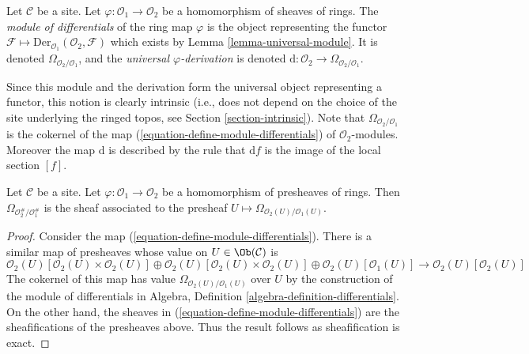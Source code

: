 \begin{definition}
\label{definition-module-differentials}
Let $\mathcal{C}$ be a site. Let $\varphi : \mathcal{O}_1 \to \mathcal{O}_2$
be a homomorphism of sheaves of rings. The {\it module of differentials}
of the ring map $\varphi$ is the object representing the functor
$\mathcal{F} \mapsto \text{Der}_{\mathcal{O}_1}(\mathcal{O}_2, \mathcal{F})$
which exists by Lemma \ref{lemma-universal-module}.
It is denoted $\Omega_{\mathcal{O}_2/\mathcal{O}_1}$, and the {\it universal
$\varphi$-derivation} is denoted
$\text{d} : \mathcal{O}_2 \to \Omega_{\mathcal{O}_2/\mathcal{O}_1}$.
\end{definition}

\noindent
Since this module and the derivation form the universal object representing
a functor, this notion is clearly intrinsic (i.e., does not depend
on the choice of the site underlying the ringed topos, see
Section \ref{section-intrinsic}).
Note that $\Omega_{\mathcal{O}_2/\mathcal{O}_1}$ is the cokernel of
the map (\ref{equation-define-module-differentials}) of
$\mathcal{O}_2$-modules. Moreover the map $\text{d}$ is described
by the rule that $\text{d}f$ is the image of the local section $[f]$.

\begin{lemma}
\label{lemma-differentials-sheafify}
Let $\mathcal{C}$ be a site. Let $\varphi : \mathcal{O}_1 \to \mathcal{O}_2$
be a homomorphism of presheaves of rings. Then
$\Omega_{\mathcal{O}_2^\#/\mathcal{O}_1^\#}$ is the sheaf associated to the
presheaf $U \mapsto \Omega_{\mathcal{O}_2(U)/\mathcal{O}_1(U)}$.
\end{lemma}

\begin{proof}
Consider the map (\ref{equation-define-module-differentials}). There is
a similar map of presheaves whose value on $U \in \Ob(\mathcal{C})$ is
$$
\mathcal{O}_2(U)[\mathcal{O}_2(U) \times \mathcal{O}_2(U)] \oplus
\mathcal{O}_2(U)[\mathcal{O}_2(U) \times \mathcal{O}_2(U)] \oplus
\mathcal{O}_2(U)[\mathcal{O}_1(U)]
\longrightarrow
\mathcal{O}_2(U)[\mathcal{O}_2(U)]
$$
The cokernel of this map has value $\Omega_{\mathcal{O}_2(U)/\mathcal{O}_1(U)}$
over $U$ by the construction of the module of differentials in 
Algebra, Definition \ref{algebra-definition-differentials}.
On the other hand, the sheaves in (\ref{equation-define-module-differentials})
are the sheafifications of the presheaves above. Thus the result follows
as sheafification is exact.
\end{proof}

